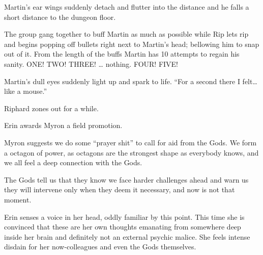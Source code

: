 Martin’s ear wings suddenly detach and flutter into the distance and he falls a short distance to the dungeon floor.\medskip

The group gang together to buff Martin as much as possible while Rip lets rip and begins popping off bullets right next to Martin’s head; bellowing him to snap out of it. From the length of the buffs Martin has 10 attempts to regain his sanity. ONE! TWO! THREE! … nothing. FOUR! FIVE!\medskip

Martin’s dull eyes suddenly light up and spark to life. “For a second there I felt… like a mouse.”\medskip

Riphard zones out for a while.\medskip

Erin awards Myron a field promotion.\medskip

Myron suggests we do some “prayer shit” to call for aid from the Gods. We form a octagon of power, as octagons are the strongest shape as everybody knows, and we all feel a deep connection with the Gods.\medskip

The Gods tell us that they know we face harder challenges ahead and warn us they will intervene only when they deem it necessary, and now is not that moment.\medskip

Erin senses a voice in her head, oddly familiar by this point. This time she is convinced that these are her own thoughts emanating from somewhere deep inside her brain and definitely not an external psychic malice. She feels intense disdain for her now-colleagues and even the Gods themselves.\medskip

\vspace*{5mm}
